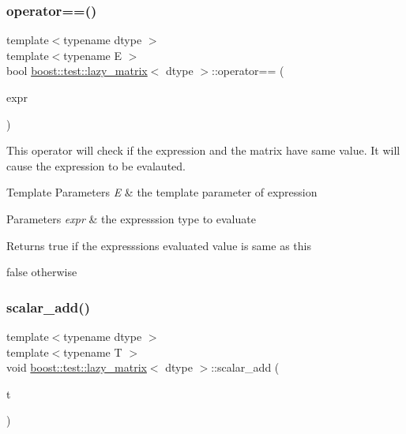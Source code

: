 \subsubsection{\texorpdfstring{operator==()}{operator==()}}
{\footnotesize\ttfamily template$<$typename dtype $>$ \\
template$<$typename E $>$ \\
bool \mbox{\hyperlink{classboost_1_1test_1_1lazy__matrix}{boost\+::test\+::lazy\+\_\+matrix}}$<$ dtype $>$\+::operator== (\begin{DoxyParamCaption}\item[{\mbox{\hyperlink{classboost_1_1test_1_1expression}{expression}}$<$ E $>$ const \&}]{expr }\end{DoxyParamCaption})\hspace{0.3cm}{\ttfamily [inline]}}



This operator will check if the expression and the matrix have same value. It will cause the expression to be evalauted. 


\begin{DoxyTemplParams}{Template Parameters}
{\em E} & the template parameter of expression \\
\hline
\end{DoxyTemplParams}

\begin{DoxyParams}{Parameters}
{\em expr} & the expresssion type to evaluate \\
\hline
\end{DoxyParams}
\begin{DoxyReturn}{Returns}
true if the expresssion\textquotesingle{}s evaluated value is same as this 

false otherwise 
\end{DoxyReturn}
\mbox{\label{classboost_1_1test_1_1lazy__matrix_a357bdf244789558e59663c09bea0c0b5}} 
\subsubsection{\texorpdfstring{scalar\_add()}{scalar\_add()}}
{\footnotesize\ttfamily template$<$typename dtype $>$ \\
template$<$typename T $>$ \\
void \mbox{\hyperlink{classboost_1_1test_1_1lazy__matrix}{boost\+::test\+::lazy\+\_\+matrix}}$<$ dtype $>$\+::scalar\+\_\+add (\begin{DoxyParamCaption}\item[{T}]{t }\end{DoxyParamCaption})\hspace{0.3cm}{\ttfamily [inline]}}



